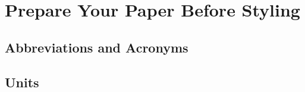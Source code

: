 \documentclass[conference]{IEEEtran}
\begin{document}

\section{Prepare Your Paper Before Styling}


\subsection{Abbreviations and Acronyms}\label{AA}

\subsection{Units}
\end{document}
